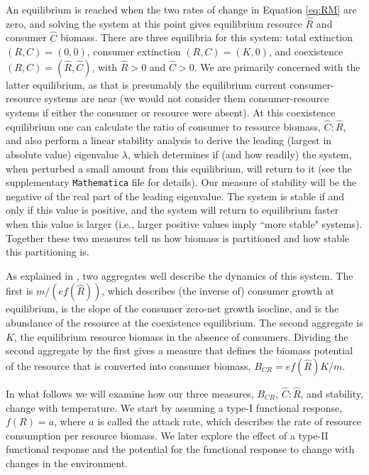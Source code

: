 \documentclass[11pt]{article}
\begin{document}
An equilibrium is reached when the two rates of change in Equation \eqref{eq:RM} are zero, and solving the system at this point gives equilibrium resource $\hat{R}$ and consumer $\hat{C}$ biomass.
There are three equilibria for this system: total extinction $(R,C) = (0,0)$, consumer extinction $(R,C)=(K,0)$, and coexistence $(R,C)=(\hat{R},\hat{C})$, with $\hat{R}>0$ and $\hat{C}>0$.
We are primarily concerned with the latter equilibrium, as that is presumably the equilibrium current consumer-resource systems are near (we would not consider them consumer-resource systems if either the consumer or resource were absent).
At this coexistence equilibrium one can calculate the ratio of consumer to resource biomass, $\hat{C}:\hat{R}$, and also perform a linear stability analysis to derive the leading (largest in absolute value) eigenvalue $\lambda$, which determines if (and how readily) the system, when perturbed a small amount from this equilibrium, will return to it (see the supplementary \texttt{Mathematica} file for details).
Our measure of stability will be the negative of the real part of the leading eigenvalue.
The system is stable if and only if this value is positive, and the system will return to equilibrium faster when this value is larger (i.e., larger positive values imply ``more stable" systems).
Together these two measures tell us how biomass is partitioned and how stable this partitioning is.

As explained in \cite{Gilbert2014}, two aggregates well describe the dynamics of this system.
The first is $m /(e f(\hat{R}))$, which describes (the inverse of) consumer growth at equilibrium, is the slope of the consumer zero-net growth isocline, and is the abundance of the resource at the coexistence equilibrium.
The second aggregate is $K$, the equilibrium resource biomass in the absence of consumers.
Dividing the second aggregate by the first gives a measure that defines the biomass potential of the resource that is converted into consumer biomass, $B_{CR} = e f(\hat{R}) K / m$.

In what follows we will examine how our three measures, $B_{CR}$, $\hat{C}:\hat{R}$, and stability, change with temperature.
We start by assuming a type-I functional response, $f(R) = a$, where $a$ is called the attack rate, which describes the rate of resource consumption per resource biomass.
We later explore the effect of a type-II functional response and the potential for the functional response to change with changes in the environment.
\end{document}
